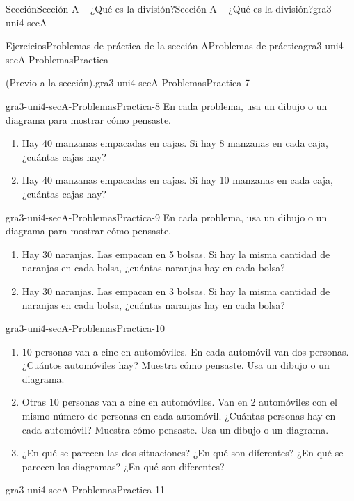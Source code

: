 \documentclass[twoside,10pt,]{article}
\begin{document}
\begin{sectionptx}{Sección}{Sección A -~¿Qué es la división?}{}{Sección A -~¿Qué es la división?}{}{}{gra3-uni4-secA}
\begin{exercises-subsection}{Ejercicios}{Problemas de práctica de la sección A}{}{Problemas de práctica}{}{}{gra3-uni4-secA-ProblemasPractica}
\begin{divisionexercise}{5}{(Previo a la sección).}{}{gra3-uni4-secA-ProblemasPractica-7}
\begin{enumerate}[label={(\alph*)}]
\end{enumerate}
%
\end{divisionexercise}%
\begin{divisionexercise}{6}{}{}{gra3-uni4-secA-ProblemasPractica-8}%
En cada problema, usa un dibujo o un diagrama para mostrar cómo pensaste.%
\par
%
\begin{enumerate}[label={(\alph*)}]
\item{}Hay 40 manzanas empacadas en cajas. Si hay 8 manzanas en cada caja, ¿cuántas cajas hay?%
\item{}Hay 40 manzanas empacadas en cajas. Si hay 10 manzanas en cada caja, ¿cuántas cajas hay?%
\end{enumerate}
%
\end{divisionexercise}%
\begin{divisionexercise}{7}{}{}{gra3-uni4-secA-ProblemasPractica-9}%
En cada problema, usa un dibujo o un diagrama para mostrar cómo pensaste.%
%
\begin{enumerate}[label={(\alph*)}]
\item{}Hay 30 naranjas. Las empacan en 5 bolsas. Si hay la misma cantidad de naranjas en cada bolsa, ¿cuántas naranjas hay en cada bolsa?%
\item{}Hay 30 naranjas. Las empacan en 3 bolsas. Si hay la misma cantidad de naranjas en cada bolsa, ¿cuántas naranjas hay en cada bolsa?%
\end{enumerate}
\end{divisionexercise}%
\begin{divisionexercise}{8}{}{}{gra3-uni4-secA-ProblemasPractica-10}%
%
\begin{enumerate}[label={(\alph*)}]
\item{}10 personas van a cine en automóviles. En cada automóvil van dos personas. ¿Cuántos automóviles hay? Muestra cómo pensaste. Usa un dibujo o un diagrama.%
\item{}Otras 10 personas van a cine en automóviles. Van en 2 automóviles con el mismo número de personas en cada automóvil. ¿Cuántas personas hay en cada automóvil? Muestra cómo pensaste. Usa un dibujo o un diagrama.%
\item{}¿En qué se parecen las dos situaciones? ¿En qué son diferentes? ¿En qué se parecen los diagramas? ¿En qué son diferentes?%
\end{enumerate}
%
\end{divisionexercise}%
\begin{divisionexercise}{9}{}{}{gra3-uni4-secA-ProblemasPractica-11}%

\end{divisionexercise}
\end{exercises-subsection}
\end{sectionptx}
\end{document}
